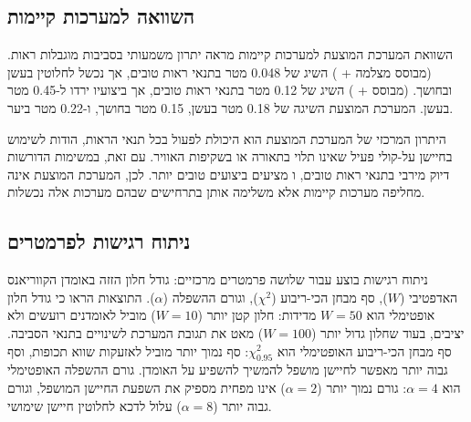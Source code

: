 \begin{table}[htbp]
\centering
\caption{עלות חישובית וזמן ריצה של רכיבי המערכת. (Computational cost and runtime of system components.)}
\label{tab:ch08_computational_cost}
\end{table}

\subsection{השוואה למערכות קיימות}
\label{sec:ch08_comparison}

השוואת המערכת המוצעת למערכות קיימות מראה יתרון משמעותי בסביבות מוגבלות ראות.  (מבוסס מצלמה + ) השיג  של 0.048 מטר בתנאי ראות טובים, אך נכשל לחלוטין בעשן ובחושך.  (מבוסס  + ) השיג  של 0.12 מטר בתנאי ראות טובים, אך ביצועיו ירדו ל-0.45 מטר בעשן. המערכת המוצעת השיגה  של 0.18 מטר בעשן, 0.15 מטר בחושך, ו-0.22 מטר ביער. \cite{CrewAIDocs} \cite{Thrun2005ProbRobotics}

היתרון המרכזי של המערכת המוצעת הוא היכולת לפעול בכל תנאי הראות, הודות לשימוש בחיישן על-קולי פעיל שאינו תלוי בתאורה או בשקיפות האוויר. עם זאת, במשימות הדורשות דיוק מירבי בתנאי ראות טובים,  ו מציעים ביצועים טובים יותר. לכן, המערכת המוצעת אינה מחליפה מערכות קיימות אלא משלימה אותן בתרחישים שבהם מערכות אלה נכשלות. \cite{CrewAIDocs}

\subsection{ניתוח רגישות לפרמטרים}
\label{sec:ch08_sensitivity}

ניתוח רגישות בוצע עבור שלושה פרמטרים מרכזיים: גודל חלון הזזה באומדן הקווריאנס האדפטיבי ($W$), סף מבחן הכי-ריבוע ($\chi^2$), וגורם ההשפלה ($\alpha$). התוצאות הראו כי גודל חלון אופטימלי הוא $W = 50$ מדידות: חלון קטן יותר ($W = 10$) מוביל לאומדנים רועשים ולא יציבים, בעוד שחלון גדול יותר ($W = 100$) מאט את תגובת המערכת לשינויים בתנאי הסביבה. סף מבחן הכי-ריבוע האופטימלי הוא $\chi^2_{0.95}$: סף נמוך יותר מוביל לאזעקות שווא תכופות, וסף גבוה יותר מאפשר לחיישן מושפל להמשיך להשפיע על האומדן. גורם ההשפלה האופטימלי הוא $\alpha = 4$: גורם נמוך יותר ($\alpha = 2$) אינו מפחית מספיק את השפעת החיישן המושפל, וגורם גבוה יותר ($\alpha = 8$) עלול לדכא לחלוטין חיישן שימושי. \cite{CrewAIDocs}

